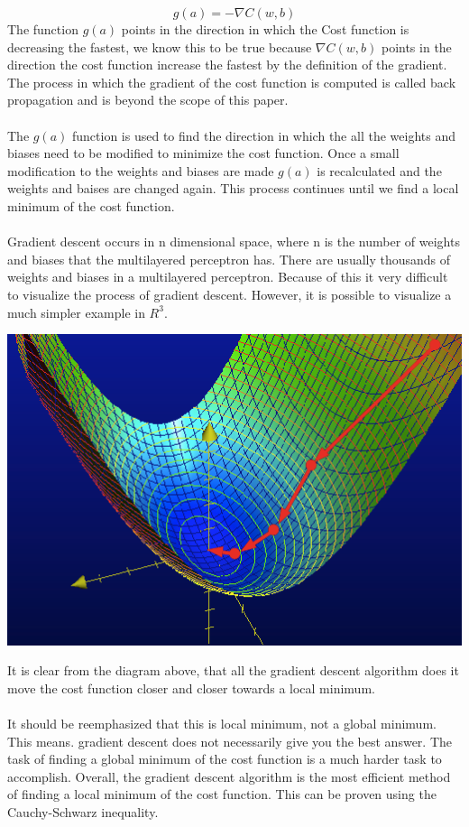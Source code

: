 $$
	g(a) = -\nabla C(w,b)
$$
The function $g(a)$ points in the direction in which the Cost function is decreasing the fastest, we know this to be true because $\nabla C(w,b)$ points in the direction the cost function increase the fastest by the definition of the gradient. The process in which the gradient of the cost function is computed is called back propagation and is beyond the scope of this paper.\\ \\
The $g(a)$ function is used to find the direction in which the all the weights and biases need to be modified to minimize the cost function. Once a small modification to the weights and biases are made $g(a)$ is recalculated and the weights and baises are changed again. This process continues until we find a local minimum of the cost function.\\ \\
Gradient descent occurs in n dimensional space, where n is the number of weights and biases that the multilayered perceptron has. There are usually thousands of weights and biases in a multilayered perceptron. Because of this it very difficult to visualize the process of gradient descent. However, it is possible to visualize a much simpler example in $R^3$.

\begin{center}
	\includegraphics[scale=0.5]{images/gradientdescent}
\end{center}
It is clear from the diagram above, that all the gradient descent algorithm does it move the cost function closer and closer towards a local minimum.\\ \\
It should be reemphasized that this is local minimum, not a global minimum. This means. gradient descent does not necessarily give you the best answer. The task of finding a global minimum of the cost function is a much harder task to accomplish. Overall, the gradient descent algorithm is the most efficient method of finding a local minimum of the cost function. This can be proven using the Cauchy-Schwarz inequality.

